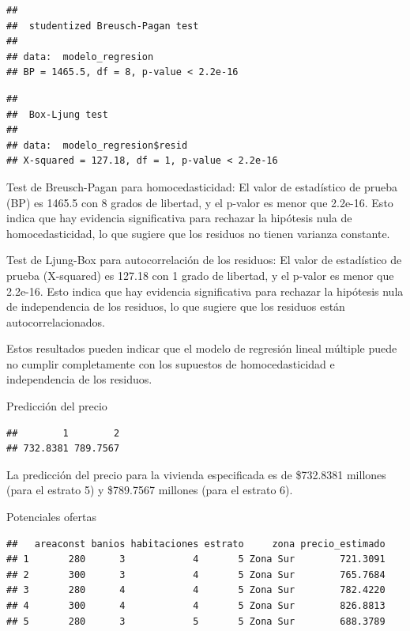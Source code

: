 \documentclass[
]{article}
\begin{document}
\begin{verbatim}
## 
##  studentized Breusch-Pagan test
## 
## data:  modelo_regresion
## BP = 1465.5, df = 8, p-value < 2.2e-16
\end{verbatim}

\begin{verbatim}
## 
##  Box-Ljung test
## 
## data:  modelo_regresion$resid
## X-squared = 127.18, df = 1, p-value < 2.2e-16
\end{verbatim}

Test de Breusch-Pagan para homocedasticidad: El valor de estadístico de
prueba (BP) es 1465.5 con 8 grados de libertad, y el p-valor es menor
que 2.2e-16. Esto indica que hay evidencia significativa para rechazar
la hipótesis nula de homocedasticidad, lo que sugiere que los residuos
no tienen varianza constante.

Test de Ljung-Box para autocorrelación de los residuos: El valor de
estadístico de prueba (X-squared) es 127.18 con 1 grado de libertad, y
el p-valor es menor que 2.2e-16. Esto indica que hay evidencia
significativa para rechazar la hipótesis nula de independencia de los
residuos, lo que sugiere que los residuos están autocorrelacionados.

Estos resultados pueden indicar que el modelo de regresión lineal
múltiple puede no cumplir completamente con los supuestos de
homocedasticidad e independencia de los residuos.

Predicción del precio

\begin{verbatim}
##        1        2 
## 732.8381 789.7567
\end{verbatim}

La predicción del precio para la vivienda especificada es de \$732.8381
millones (para el estrato 5) y \$789.7567 millones (para el estrato 6).

Potenciales ofertas

\begin{verbatim}
##   areaconst banios habitaciones estrato     zona precio_estimado
## 1       280      3            4       5 Zona Sur        721.3091
## 2       300      3            4       5 Zona Sur        765.7684
## 3       280      4            4       5 Zona Sur        782.4220
## 4       300      4            4       5 Zona Sur        826.8813
## 5       280      3            5       5 Zona Sur        688.3789
\end{verbatim}
\end{document}
